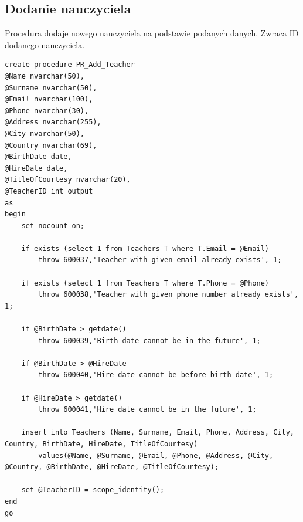 \documentclass[11pt,a4paper]{article}
\begin{document}
\subsection{Dodanie nauczyciela}
Procedura dodaje nowego nauczyciela na podstawie podanych danych. Zwraca ID dodanego nauczyciela.
\begin{Verbatim}[breaklines=true]
create procedure PR_Add_Teacher
@Name nvarchar(50),
@Surname nvarchar(50),
@Email nvarchar(100),
@Phone nvarchar(30),
@Address nvarchar(255),
@City nvarchar(50),
@Country nvarchar(69),
@BirthDate date,
@HireDate date,
@TitleOfCourtesy nvarchar(20),
@TeacherID int output
as
begin
    set nocount on;

    if exists (select 1 from Teachers T where T.Email = @Email)
        throw 600037,'Teacher with given email already exists', 1;

    if exists (select 1 from Teachers T where T.Phone = @Phone)
        throw 600038,'Teacher with given phone number already exists', 1;

    if @BirthDate > getdate()
        throw 600039,'Birth date cannot be in the future', 1;

    if @BirthDate > @HireDate
        throw 600040,'Hire date cannot be before birth date', 1;

    if @HireDate > getdate()
        throw 600041,'Hire date cannot be in the future', 1;

    insert into Teachers (Name, Surname, Email, Phone, Address, City, Country, BirthDate, HireDate, TitleOfCourtesy)
        values(@Name, @Surname, @Email, @Phone, @Address, @City, @Country, @BirthDate, @HireDate, @TitleOfCourtesy);

    set @TeacherID = scope_identity();
end
go
\end{Verbatim}
\end{document}

